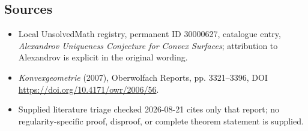 \documentclass[11pt]{article}
\begin{document}
\subsection{Sources}
\begin{itemize}
\item Local UnsolvedMath registry, permanent ID 30000627, catalogue entry, \emph{Alexandrov Uniqueness Conjecture for Convex Surfaces}; attribution to Alexandrov is explicit in the original wording.
\item \emph{Konvexgeometrie} (2007), Oberwolfach Reports, pp. 3321--3396, DOI \url{https://doi.org/10.4171/owr/2006/56}.
\item Supplied literature triage checked 2026-08-21 cites only that report; no regularity-specific proof, disproof, or complete theorem statement is supplied.
\end{itemize}
\end{document}
